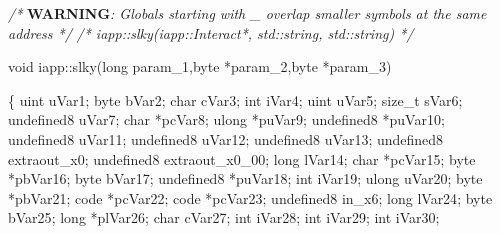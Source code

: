 \documentclass[
]{article}
\newenvironment{Shaded}{}{}
\newcommand{\AlertTok}[1]{\textcolor[rgb]{1.00,0.00,0.00}{\textbf{#1}}}
\newcommand{\CommentTok}[1]{\textcolor[rgb]{0.38,0.63,0.69}{\textit{#1}}}
\newcommand{\DataTypeTok}[1]{\textcolor[rgb]{0.56,0.13,0.00}{#1}}
\newcommand{\ExtensionTok}[1]{#1}
\newcommand{\NormalTok}[1]{#1}
\newcommand{\OperatorTok}[1]{\textcolor[rgb]{0.40,0.40,0.40}{#1}}
\begin{document}
\begin{Shaded}
\begin{Highlighting}[]

\CommentTok{/* }\AlertTok{WARNING}\CommentTok{: Globals starting with \textquotesingle{}\_\textquotesingle{} overlap smaller symbols at the same address */}
\CommentTok{/* iapp::slky(iapp::Interact*, std::string, std::string) */}

\DataTypeTok{void}\NormalTok{ iapp}\OperatorTok{::}\NormalTok{slky}\OperatorTok{(}\DataTypeTok{long}\NormalTok{ param\_1}\OperatorTok{,}\NormalTok{byte }\OperatorTok{*}\NormalTok{param\_2}\OperatorTok{,}\NormalTok{byte }\OperatorTok{*}\NormalTok{param\_3}\OperatorTok{)}

\OperatorTok{\{}
  \ExtensionTok{uint}\NormalTok{ uVar1}\OperatorTok{;}
\NormalTok{  byte bVar2}\OperatorTok{;}
  \DataTypeTok{char}\NormalTok{ cVar3}\OperatorTok{;}
  \DataTypeTok{int}\NormalTok{ iVar4}\OperatorTok{;}
  \ExtensionTok{uint}\NormalTok{ uVar5}\OperatorTok{;}
  \DataTypeTok{size\_t}\NormalTok{ sVar6}\OperatorTok{;}
\NormalTok{  undefined8 uVar7}\OperatorTok{;}
  \DataTypeTok{char} \OperatorTok{*}\NormalTok{pcVar8}\OperatorTok{;}
  \ExtensionTok{ulong} \OperatorTok{*}\NormalTok{puVar9}\OperatorTok{;}
\NormalTok{  undefined8 }\OperatorTok{*}\NormalTok{puVar10}\OperatorTok{;}
\NormalTok{  undefined8 uVar11}\OperatorTok{;}
\NormalTok{  undefined8 uVar12}\OperatorTok{;}
\NormalTok{  undefined8 uVar13}\OperatorTok{;}
\NormalTok{  undefined8 extraout\_x0}\OperatorTok{;}
\NormalTok{  undefined8 extraout\_x0\_00}\OperatorTok{;}
  \DataTypeTok{long}\NormalTok{ lVar14}\OperatorTok{;}
  \DataTypeTok{char} \OperatorTok{*}\NormalTok{pcVar15}\OperatorTok{;}
\NormalTok{  byte }\OperatorTok{*}\NormalTok{pbVar16}\OperatorTok{;}
\NormalTok{  byte bVar17}\OperatorTok{;}
\NormalTok{  undefined8 }\OperatorTok{*}\NormalTok{puVar18}\OperatorTok{;}
  \DataTypeTok{int}\NormalTok{ iVar19}\OperatorTok{;}
  \ExtensionTok{ulong}\NormalTok{ uVar20}\OperatorTok{;}
\NormalTok{  byte }\OperatorTok{*}\NormalTok{pbVar21}\OperatorTok{;}
\NormalTok{  code }\OperatorTok{*}\NormalTok{pcVar22}\OperatorTok{;}
\NormalTok{  code }\OperatorTok{*}\NormalTok{pcVar23}\OperatorTok{;}
\NormalTok{  undefined8 in\_x6}\OperatorTok{;}
  \DataTypeTok{long}\NormalTok{ lVar24}\OperatorTok{;}
\NormalTok{  byte bVar25}\OperatorTok{;}
  \DataTypeTok{long} \OperatorTok{*}\NormalTok{plVar26}\OperatorTok{;}
  \DataTypeTok{char}\NormalTok{ cVar27}\OperatorTok{;}
  \DataTypeTok{int}\NormalTok{ iVar28}\OperatorTok{;}
  \DataTypeTok{int}\NormalTok{ iVar29}\OperatorTok{;}
  \DataTypeTok{int}\NormalTok{ iVar30}\OperatorTok{;}

\end{Highlighting}
\end{Shaded}
\end{document}

